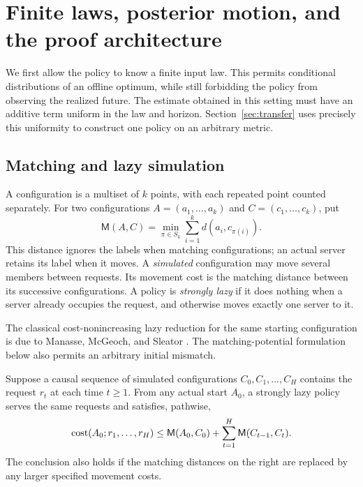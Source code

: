 \section{Finite laws, posterior motion, and the proof architecture}\label{sec:setup}

We first allow the policy to know a finite input law. This permits
conditional distributions of an offline optimum, while still forbidding
the policy from observing the realized future. The estimate obtained in
this setting must have an additive term uniform in the law and horizon.
Section~\ref{sec:transfer} uses precisely this uniformity to construct
one policy on an arbitrary metric.

\subsection{Matching and lazy simulation}

A configuration is a multiset of \(k\) points, with each repeated
point counted separately. For two configurations \(A=(a_1,\ldots,a_k)\)
and \(C=(c_1,\ldots,c_k)\), put
\[
 \mathsf M(A,C)=\min_{\pi\in S_k}\sum_{i=1}^k d(a_i,c_{\pi(i)}).
\]
This distance ignores the labels when matching configurations; an
actual server retains its label when it moves. A \emph{simulated}
configuration may move several members between requests. Its movement
cost is the matching distance between its successive configurations.
A policy is \emph{strongly lazy} if it does nothing when a server already
occupies the request, and otherwise moves exactly one server to it.

The classical cost-nonincreasing lazy reduction for the same starting
configuration is due to Manasse, McGeoch, and Sleator
\cite[Lemma~1, p.~211]{MMS90}. The matching-potential formulation below
also permits an arbitrary initial mismatch.

\begin{lemma}\label{lem:lazy-simulation}
Suppose a causal sequence of simulated configurations
\(C_0,C_1,\ldots,C_H\) contains the request \(r_t\) at each time
\(t\ge1\). From any actual start \(A_0\), a strongly lazy policy serves
the same requests and satisfies, pathwise,
\[
 \operatorname{cost}(A_0;r_1,\ldots,r_H)
 \le \mathsf M(A_0,C_0)+\sum_{t=1}^H\mathsf M(C_{t-1},C_t).
\]
The conclusion also holds if the matching distances on the right are
replaced by any larger specified movement costs.
\end{lemma}

